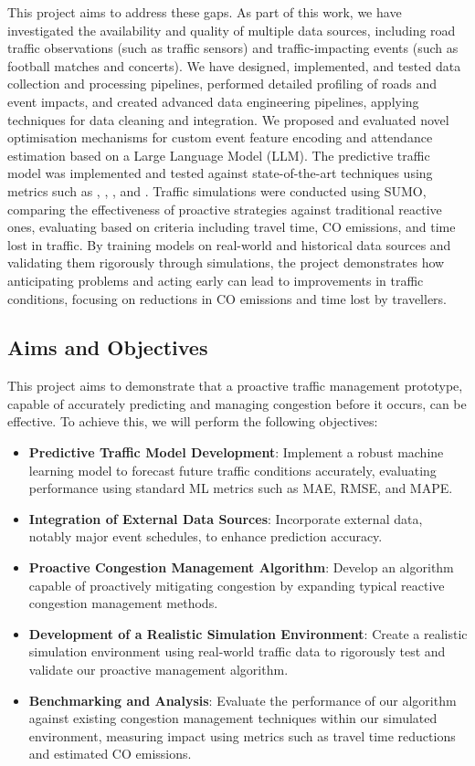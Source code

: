 This project aims to address these gaps. As part of this work, we have investigated the availability and quality of multiple data sources, including road traffic observations (such as traffic sensors) and traffic-impacting events (such as football matches and concerts). We have designed, implemented, and tested data collection and processing pipelines, performed detailed profiling of roads and event impacts, and created advanced data engineering pipelines, applying techniques for data cleaning and integration. We proposed and evaluated novel optimisation mechanisms for custom event feature encoding and attendance estimation based on a Large Language Model (LLM). The predictive traffic model was implemented and tested against state-of-the-art techniques using metrics such as , , , and . Traffic simulations were conducted using SUMO, comparing the effectiveness of proactive strategies against traditional reactive ones, evaluating based on criteria including travel time, CO emissions, and time lost in traffic. By training models on real-world and historical data sources and validating them rigorously through simulations, the project demonstrates how anticipating problems and acting early can lead to improvements in traffic conditions, focusing on reductions in CO emissions and time lost by travellers.

\subsection{Aims and Objectives}
This project aims to demonstrate that a proactive traffic management prototype, capable of accurately predicting and managing congestion before it occurs, can be effective. To achieve this, we will perform the following objectives:

\begin{itemize}
\item \textbf{Predictive Traffic Model Development}: Implement a robust machine learning model to forecast future traffic conditions accurately, evaluating performance using standard ML metrics such as MAE, RMSE, and MAPE.
\item \textbf{Integration of External Data Sources}: Incorporate external data, notably major event schedules, to enhance prediction accuracy.
\item \textbf{Proactive Congestion Management Algorithm}: Develop an algorithm capable of proactively mitigating congestion by expanding typical reactive congestion management methods.
\item \textbf{Development of a Realistic Simulation Environment}: Create a realistic simulation environment using real-world traffic data to rigorously test and validate our proactive management algorithm.
\item \textbf{Benchmarking and Analysis}: Evaluate the performance of our algorithm against existing congestion management techniques within our simulated environment, measuring impact using metrics such as travel time reductions and estimated CO emissions.
\end{itemize}

